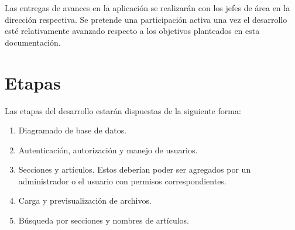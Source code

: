 \documentclass{article}
\begin{document}
Las entregas de avances en la aplicación se realizarán con los jefes de área en la dirección respectiva.
Se pretende una participación activa una vez el desarrollo esté relativamente avanzado respecto a los objetivos planteados en esta documentación.

\section{Etapas}
Las etapas del desarrollo estarán dispuestas de la siguiente forma:
\begin{enumerate}
    \item Diagramado de base de datos.
    \item Autenticación, autorización y manejo de usuarios.
    \item Secciones y artículos. Estos deberían poder ser agregados por un administrador o el usuario con permisos correspondientes.
    \item Carga y previsualización de archivos.
    \item Búsqueda por secciones y nombres de artículos.
\end{enumerate}
\end{document}
